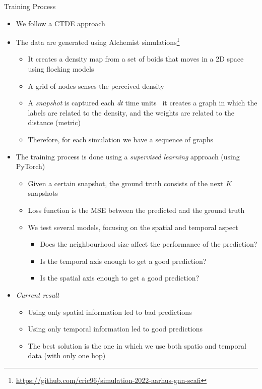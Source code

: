 \documentclass[presentation, 9pt]{beamer}\mode<presentation>{\usetheme{AMSBolognaFC}}
\begin{document}
\begin{frame}{Training Process}
\begin{itemize}
	\item We follow a CTDE approach
	\item The data are generated using Alchemist simulations\footnote{\url{https://github.com/cric96/simulation-2022-aarhus-gnn-scafi}}
	\begin{itemize}
		\item It creates a density map from a set of boids that moves in a 2D space using flocking models
		\item A grid of nodes senses the perceived density 
		\item A \emph{snapshot} is captured each \emph{dt} time units \faArrowRight \, it creates a graph in which the labels are related to the density, and the weights are related to the distance (metric)
		\item  Therefore, for each simulation we have a sequence of graphs
	\end{itemize}
	\item The training process is done using a \emph{supervised learning} approach (using PyTorch)
	\begin{itemize}
		\item Given a certain snapshot, the ground truth consists of the next $K$ snapshots
		\item Loss function is the MSE between the predicted and the ground truth
	\item We test several models, focusing on the spatial and temporal aspect
	\begin{itemize}
		\item Does the neighbourhood size affect the performance of the prediction? 
		\item Is the temporal axis enough to get a good prediction?
		\item Is the spatial axis enough to get a good prediction?
	\end{itemize}
	\end{itemize}
	\item \emph{Current result}
	\begin{itemize}
		\item Using only spatial information led to bad predictions
		\item Using only temporal information led to good predictions
		\item The best solution is the one in which we use both spatio and temporal data (with only one hop)
	\end{itemize}

\end{itemize}
\end{frame}
\end{document}
